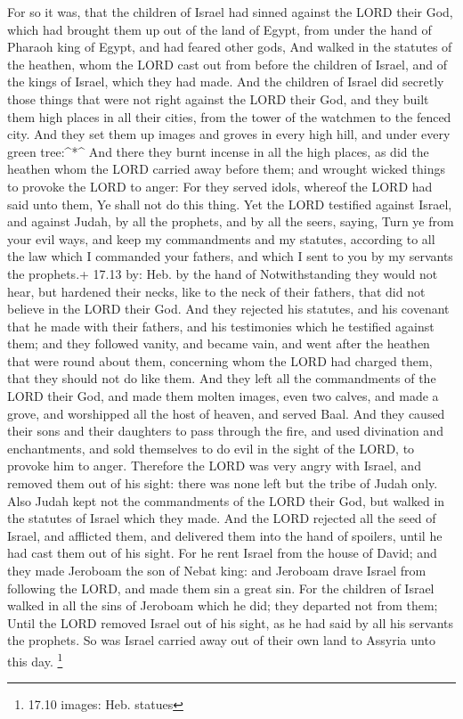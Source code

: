  For so it was, that the children of Israel had sinned
against the LORD their God, which had brought them up out of the land of
Egypt, from under the hand of Pharaoh king of Egypt, and had feared
other gods,  And walked in the statutes of the heathen, whom
the LORD cast out from before the children of Israel, and of the kings
of Israel, which they had made.  And the children of Israel
did secretly those things that were not right against the LORD their
God, and they built them high places in all their cities, from the tower
of the watchmen to the fenced city.  And they set them up
images and groves in every high hill, and under every green
tree:\^{}*\^{}  And there they burnt incense in all the
high places, as did the heathen whom the LORD carried away before them;
and wrought wicked things to provoke the LORD to anger: 
For they served idols, whereof the LORD had said unto them, Ye shall not
do this thing.  Yet the LORD testified against Israel, and
against Judah, by all the prophets, and by all the seers, saying, Turn
ye from your evil ways, and keep my commandments and my statutes,
according to all the law which I commanded your fathers, and which I
sent to you by my servants the prophets.+ 17.13 by: Heb. by the hand of
 Notwithstanding they would not hear, but hardened their
necks, like to the neck of their fathers, that did not believe in the
LORD their God.  And they rejected his statutes, and his
covenant that he made with their fathers, and his testimonies which he
testified against them; and they followed vanity, and became vain, and
went after the heathen that were round about them, concerning whom the
LORD had charged them, that they should not do like them. 
And they left all the commandments of the LORD their God, and made them
molten images, even two calves, and made a grove, and worshipped all the
host of heaven, and served Baal.  And they caused their
sons and their daughters to pass through the fire, and used divination
and enchantments, and sold themselves to do evil in the sight of the
LORD, to provoke him to anger.  Therefore the LORD was very
angry with Israel, and removed them out of his sight: there was none
left but the tribe of Judah only.  Also Judah kept not the
commandments of the LORD their God, but walked in the statutes of Israel
which they made.  And the LORD rejected all the seed of
Israel, and afflicted them, and delivered them into the hand of
spoilers, until he had cast them out of his sight.  For he
rent Israel from the house of David; and they made Jeroboam the son of
Nebat king: and Jeroboam drave Israel from following the LORD, and made
them sin a great sin.  For the children of Israel walked in
all the sins of Jeroboam which he did; they departed not from them;
 Until the LORD removed Israel out of his sight, as he had
said by all his servants the prophets. So was Israel carried away out of
their own land to Assyria unto this day. \footnote{17.10 images: Heb.
  statues}

